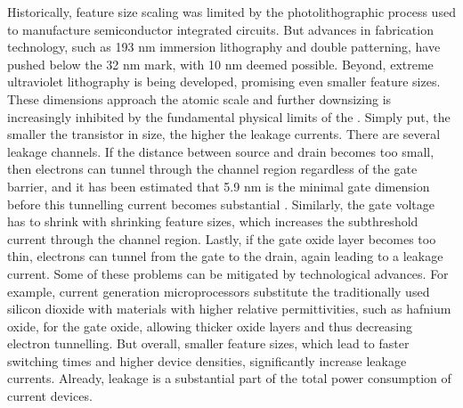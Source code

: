 Historically, feature size scaling was limited by the photolithographic process
used to manufacture semiconductor integrated circuits. But advances in
fabrication technology, such as 193 nm immersion lithography and double
patterning, have pushed below the 32 nm mark, with 10 nm deemed possible.
Beyond, extreme ultraviolet lithography is being developed, promising even
smaller feature sizes. These dimensions approach the atomic scale and further
downsizing is increasingly inhibited by the fundamental physical limits of the
. Simply put, the smaller the transistor in size, the higher the
leakage currents. There are several leakage channels. If the distance between
source and drain becomes too small, then electrons can tunnel through the
channel region regardless of the gate barrier, and it has been estimated that
5.9 nm is the minimal gate dimension before this tunnelling current becomes
substantial \cite{cavin2012science}. Similarly, the gate voltage has to shrink
with shrinking feature sizes, which increases the subthreshold current through
the channel region. Lastly, if the gate oxide layer becomes too thin, electrons
can tunnel from the gate to the drain, again leading to a leakage current. Some
of these problems can be mitigated by technological advances. For example,
current generation microprocessors substitute the traditionally used silicon
dioxide with materials with higher relative permittivities, such as hafnium
oxide, for the gate oxide, allowing thicker oxide layers and thus decreasing
electron tunnelling. But overall, smaller feature sizes, which lead to faster
switching times and higher device densities, significantly increase leakage
currents.  Already, leakage is a substantial part of the total power consumption
of current devices.

